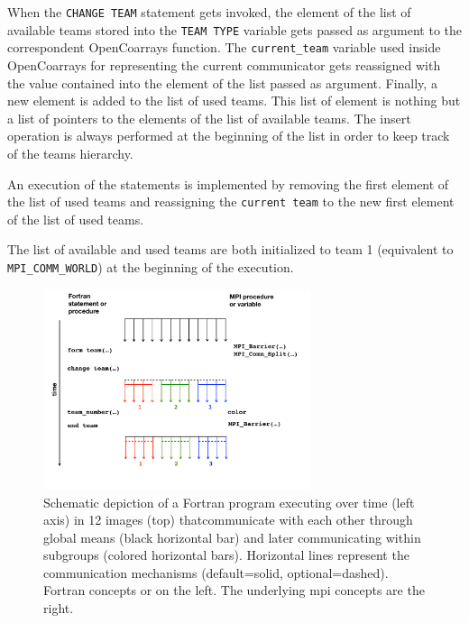 When the \texttt{CHANGE TEAM} statement gets invoked, the element of the list of available teams stored into the \texttt{TEAM TYPE} variable
gets passed as argument to the correspondent OpenCoarrays function. The \texttt{current\_team} variable used inside OpenCoarrays for
representing the current communicator gets reassigned with the value contained into the element of the list passed as argument.
Finally, a new element is added to the list of used teams. This list of element is nothing but a list of pointers to the elements of the list
of available teams. The insert operation is always performed at the beginning of the list in order to keep track of the teams hierarchy.

An execution of the  statements is implemented by removing the first element of the list of used teams and reassigning the
\texttt{current team} to the new first element of the list of used teams.

The list of available and used teams are both initialized to team 1 (equivalent to \texttt{MPI\_COMM\_WORLD}) at the beginning of the execution.

\begin{figure}
\includegraphics[width=0.7\textwidth]{figures/teams}
\vspace{-36pt}
\caption{Schematic depiction of a Fortran program executing over time (left axis) in 12 images (top) thatcommunicate with each other through global means (black horizontal bar) and later communicating within subgroups (colored horizontal bars).  Horizontal lines represent the communication mechanisms (default=solid, optional=dashed).  Fortran concepts or on the left.  The underlying \gls{mpi} concepts are the right.}
\end{figure}
%

